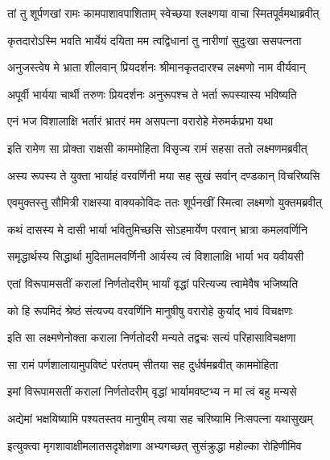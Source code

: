 
\twolineshloka
{तां तु शूर्पणखां रामः कामपाशावपाशिताम्}
{स्वेच्छया श्लक्ष्णया वाचा स्मितपूर्वमथाब्रवीत्} %

\twolineshloka
{कृतदारोऽस्मि भवति भार्येयं दयिता मम}
{त्वद्विधानां तु नारीणां सुदुःखा ससपत्नता} %

\twolineshloka
{अनुजस्त्वेष मे भ्राता शीलवान् प्रियदर्शनः}
{श्रीमानकृतदारश्च लक्ष्मणो नाम वीर्यवान्} %

\twolineshloka
{अपूर्वी भार्यया चार्थी तरुणः प्रियदर्शनः}
{अनुरूपश्च ते भर्ता रूपस्यास्य भविष्यति} %

\twolineshloka
{एनं भज विशालाक्षि भर्तारं भ्रातरं मम}
{असपत्ना वरारोहे मेरुमर्कप्रभा यथा} %

\twolineshloka
{इति रामेण सा प्रोक्ता राक्षसी काममोहिता}
{विसृज्य रामं सहसा ततो लक्ष्मणमब्रवीत्} %

\twolineshloka
{अस्य रूपस्य ते युक्ता भार्याहं वरवर्णिनी}
{मया सह सुखं सर्वान् दण्डकान् विचरिष्यसि} %

\twolineshloka
{एवमुक्तस्तु सौमित्री राक्षस्या वाक्यकोविदः}
{ततः शूर्पनखीं स्मित्वा लक्ष्मणो युक्तमब्रवीत्} %

\twolineshloka
{कथं दासस्य मे दासी भार्या भवितुमिच्छसि}
{सोऽहमार्येण परवान् भ्रात्रा कमलवर्णिनि} %

\twolineshloka
{समृद्धार्थस्य सिद्धार्था मुदितामलवर्णिनी}
{आर्यस्य त्वं विशालाक्षि भार्या भव यवीयसी} %

\twolineshloka
{एतां विरूपामसतीं करालां निर्णतोदरीम्}
{भार्यां वृद्धां परित्यज्य त्वामेवैष भजिष्यति} %

\twolineshloka
{को हि रूपमिदं श्रेष्ठं संत्यज्य वरवर्णिनि}
{मानुषीषु वरारोहे कुर्याद् भावं विचक्षणः} %

\twolineshloka
{इति सा लक्ष्मणेनोक्ता कराला निर्णतोदरी}
{मन्यते तद्वचः सत्यं परिहासाविचक्षणा} %

\twolineshloka
{सा रामं पर्णशालायामुपविष्टं परंतपम्}
{सीतया सह दुर्धर्षमब्रवीत् काममोहिता} %

\twolineshloka
{इमां विरूपामसतीं करालां निर्णतोदरीम्}
{वृद्धां भार्यामवष्टभ्य न मां त्वं बहु मन्यसे} %

\twolineshloka
{अद्येमां भक्षयिष्यामि पश्यतस्तव मानुषीम्}
{त्वया सह चरिष्यामि निःसपत्ना यथासुखम्} %

\twolineshloka
{इत्युक्त्वा मृगशावाक्षीमलातसदृशेक्षणा}
{अभ्यगच्छत् सुसंक्रुद्धा महोल्का रोहिणीमिव} %

